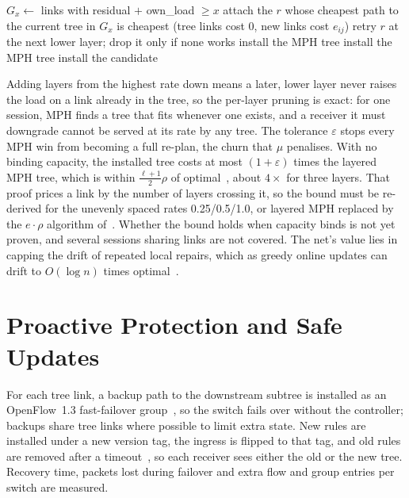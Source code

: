 \begin{algorithm}[!htb]
\caption{Capacity-aware layered MPH and install rule (one session)}
\label{alg:mph}
\begin{algorithmic}[1]
 
  \State $G_x \gets$ links with residual $+$ own\_load $\ge x$ 
    \State attach the $r$ whose cheapest path to the current tree in $G_x$ is cheapest
    \State \hspace{1em}(tree links cost 0, new links cost $e_{ij}$)
  \EndWhile
    \State retry $r$ at the next lower layer; drop it only if none works
  \EndIf
\EndFor
{}
  \State install the MPH tree
  \State install the MPH tree
\Else
  \State install the candidate
\EndIf
\end{algorithmic}
\end{algorithm}

\noindent Adding layers from the highest rate down means a later, lower layer never raises the load on a link already in the tree, so the per-layer pruning is exact: for one session, MPH finds a tree that fits whenever one exists, and a receiver it must downgrade cannot be served at its rate by any tree. The tolerance $\varepsilon$ stops every MPH win from becoming a full re-plan, the churn that $\mu$ penalises. With no binding capacity, the installed tree costs at most $(1+\varepsilon)$ times the layered MPH tree, which is within $\frac{\ell+1}{2}\rho$ of optimal~\cite{ahmed2019mlst}, about $4\times$ for three layers. That proof prices a link by the number of layers crossing it, so the bound must be re-derived for the unevenly spaced rates 0.25/0.5/1.0, or layered MPH replaced by the $e\cdot\rho$ algorithm of~\cite{charikar2004qos}. Whether the bound holds when capacity binds is not yet proven, and several sessions sharing links are not covered. The net's value lies in capping the drift of repeated local repairs, which as greedy online updates can drift to $O(\log n)$ times optimal~\cite{imase1991dynamic}.

\section{Proactive Protection and Safe Updates}\label{sec:m_protection}
\noindent For each tree link, a backup path to the downstream subtree is installed as an OpenFlow~1.3 fast-failover group~\cite{oostenbrink2017failover}, so the switch fails over without the controller; backups share tree links where possible to limit extra state. New rules are installed under a new version tag, the ingress is flipped to that tag, and old rules are removed after a timeout~\cite{reitblatt2012update}, so each receiver sees either the old or the new tree. Recovery time, packets lost during failover and extra flow and group entries per switch are measured.

